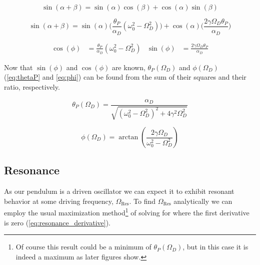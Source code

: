 \documentclass[notitlepage,aps,prd,nofootinbib]{revtex4-1}
\begin{document}
\begin{equation} \label{eq:trig_identity}
\sin\left(\alpha + \beta\right) = \sin\left(\alpha\right) \cos\left(\beta\right) + \cos\left(\alpha\right) \sin\left(\beta\right)
\end{equation}

\begin{equation} \label{eq:particular_work2}
\sin\left(\alpha + \beta\right) = \sin\left(\alpha\right) \bigg(\frac{\theta_{P}}{\alpha_{D}} \left(\omega_{0}^2 - \Omega_{D}^2\right)\bigg) + \cos\left(\alpha\right) \bigg(\frac{2 \gamma \Omega_{D} \theta_{P}}{\alpha_{D}}\bigg)
\end{equation}

\begin{align}
\label{eq:particular_work3}
\cos\left(\phi\right) &= \frac{\theta_{P}}{\alpha_{D}} \left(\omega_{0}^2 - \Omega_{D}^2\right)
&
\sin\left(\phi\right) &=  \frac{2 \gamma \Omega_{D} \theta_{P}}{\alpha_{D}}
\end{align}

Now that $\sin\left(\phi\right)$ and $\cos\left(\phi\right)$ are known, $\theta_{P}\left(\Omega_{D}\right)$ and $\phi\left(\Omega_{D}\right)$ (\ref{eq:thetaP} and \ref{eq:phi}) can be found from the sum of their squares and their ratio, respectively.

\begin{equation} \label{eq:thetaP}
\theta_{P}\left(\Omega_{D}\right) = \frac{\alpha_{D}}{\sqrt{ \left(\omega_{0}^2 - \Omega_{D}^2\right)^2 + 4 \gamma^2 \Omega_{D}^2 }}
\end{equation}

\begin{equation} \label{eq:phi}
\phi\left(\Omega_{D}\right) = \arctan\left(\frac{2 \gamma \Omega_{D}}{\omega_{0}^2 - \Omega_{D}^2}\right)
\end{equation}

\subsection{Resonance}
\label{subsec:resonance}
As our pendulum is a driven oscillator we can expect it to exhibit resonant behavior at some driving frequency, $\Omega_{\text{Res}}$. To find $\Omega_{\text{Res}}$ analytically we can employ the usual maximization method\footnote{Of course this result could be a minimum of $\theta_{P}\left(\Omega_{D}\right)$, but in this case it is indeed a maximum as later figures show.} of solving for where the first derivative is zero (\ref{eq:resonance_derivative}).
\end{document}
